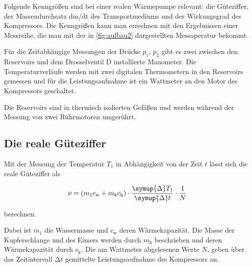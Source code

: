 Folgende Kenngrößen sind bei einer realen Wärmepumpe relevant: die Güteziffer, der Massendurchsatz dm/dt des Transportmediums und der Wirkungsgrad des Kompressors. Die Kenngrößen kann man errechnen mit den 
Ergebnissen einer Messreihe, die man mit der in \ref{fig:aufbau2} dargestellten Messaperatur bekommt.

Für die Zeitabhängige Messungen der Drücke $p_1$, $p_2$ gibt es zwei zwischen den Reservoirs und dem Drosselventil D installierte Manometer. Die 
Temperaturverläufe werden mit zwei digitalen Thermometern in den Reservoirs gemessen und für die Leistungsaufnahme ist ein Wattmeter an den Motor des Kompressors geschaltet.

Die Reservoirs sind in thermisch isolierten Gefäßen und werden während der Messung von zwei Rührmotoren umgerührt.

\subsection{Die reale Güteziffer}
Mit der Messung der Temperatur $T_1$ in Abhängigkeit von der Zeit $t$ lässt sich die reale Güteziffer als 

\begin{equation}
    \nu = (m_1 c_\text{w} + m_\text{k} c_\text{k})\cdot 
    \frac{\symup{\Delta} T_1}{\symup{\Delta} t} \cdot \frac{1}{N}
    \label{eqn:Güteziffer}
\end{equation}

berechnen.

Dabei ist $m_1$ die Wassermasse und $c_\text{w}$ deren Wärmekapazität. Die Masse der Kupferschlange und des Eimers werden durch $m_\text{k}$ beschrieben und deren Wärmekapazität
durch $c_\text{k}$. Die am Wattmeter abgelesenen Werte $N$, geben über das Zeitintervall $\increment t$ gemittelte Leistungsaufnahme des Kompressors an.
